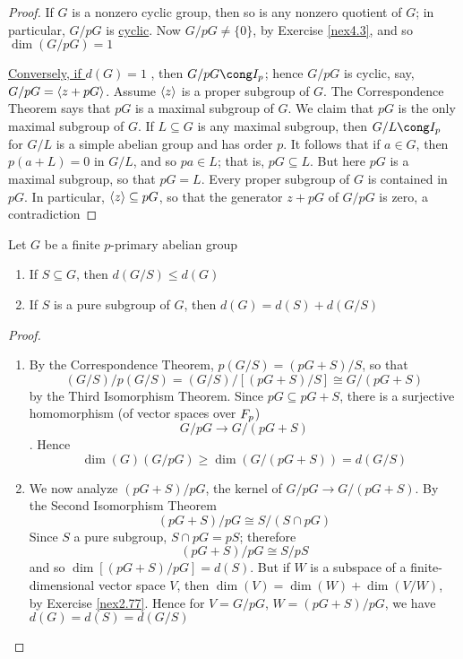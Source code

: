 \documentclass[11pt]{article}
\begin{document}
\begin{proof}
If \(G\) is a nonzero cyclic group, then so is any nonzero quotient of
\(G\); in particular, \(G/pG\) is \uline{cyclic}. Now \(G/pG\neq\{0\}\), by Exercise
\ref{nex4.3}, and so \(\dim(G/pG)=1\) 

\uline{Conversely, if \(d(G)=1\)} , then \(G/pG\cong\I_p\); hence \(G/pG\) is
cyclic, say, \(G/pG=\langle z+pG\rangle\). Assume \(\langle z\rangle\) is a proper subgroup
of \(G\). The Correspondence Theorem says that \(pG\) is a maximal subgroup
of \(G\). We claim that \(pG\) is the only maximal subgroup of \(G\). If 
\(L\subseteq G\) is any maximal subgroup, then \(G/L\cong\I_p\) for \(G/L\)
is a simple abelian group and has order \(p\). It follows that if 
\(a\in G\), then \(p(a+L)=0\) in \(G/L\), and so \(pa\in L\); that is, 
\(pG\subseteq L\). But here \(pG\) is a maximal subgroup, so that \(pG=L\).
Every proper subgroup of \(G\) is contained in \(pG\). In particular,
\(\langle z\rangle\subseteq pG\), so that the generator \(z+pG\) of \(G/pG\) is
zero, a contradiction
\end{proof}

\begin{lemma}[]
Let \(G\) be a finite \(p\)-primary abelian group
\begin{enumerate}
\item If \(S\subseteq G\), then \(d(G/S)\le d(G)\)
\item If \(S\) is a pure subgroup of \(G\), then \(d(G)=d(S)+d(G/S)\)
\end{enumerate}
\end{lemma}
\begin{proof}
\begin{enumerate}
\item By the Correspondence Theorem, \(p(G/S)=(pG+S)/S\), so that
\begin{equation*}
(G/S)/p(G/S)=(G/S)/[(pG+S)/S]\cong G/(pG+S)
\end{equation*}
by the Third Isomorphism Theorem. Since \(pG\subseteq pG+S\), there is a
surjective homomorphism (of vector spaces over \(\relax{F}_p\))
\begin{equation*}
G/pG\to G/(pG+S)
\end{equation*}. Hence
\begin{equation*}
\dim(G)(G/pG)\ge\dim(G/(pG+S))=d(G/S)
\end{equation*}
\item We now analyze \((pG+S)/pG\), the kernel of \(G/pG\to G/(pG+S)\). By the
Second Isomorphism Theorem
\begin{equation*}
(pG+S)/pG\cong S/(S\cap pG)
\end{equation*}
Since \(S\) a pure subgroup, \(S\cap pG=pS\); therefore
\begin{equation*}
(pG+S)/pG\cong S/pS
\end{equation*}
and so \(\dim[(pG+S)/pG]=d(S)\). But if \(W\) is a subspace of a
finite-dimensional vector space \(V\), then
\(\dim(V)=\dim(W)+\dim(V/W)\), by Exercise \ref{nex2.77}. Hence for
\(V=G/pG\), \(W=(pG+S)/pG\), we have \(d(G)=d(S)=d(G/S)\)
\end{enumerate}
\end{proof}
\end{document}
